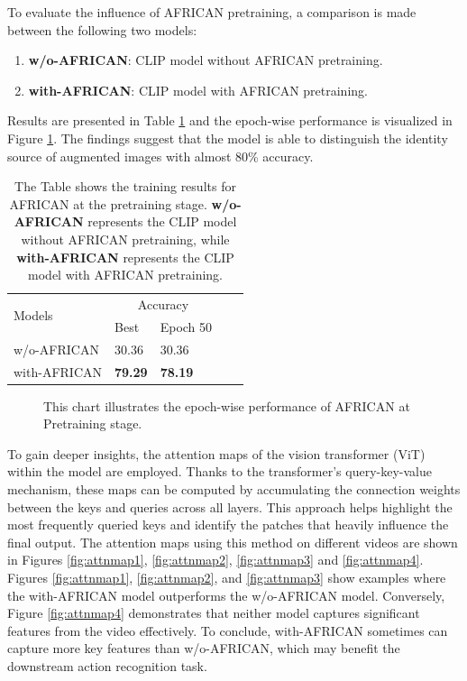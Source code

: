To evaluate the influence of AFRICAN pretraining, a comparison is made between the following two models: 

\begin{enumerate}
    \item \textbf{w/o-AFRICAN}: CLIP model without AFRICAN pretraining.
    \item \textbf{with-AFRICAN}: CLIP model with AFRICAN pretraining.
\end{enumerate}

Results are presented in Table \ref{tab:africanpretrainingresults} and the epoch-wise performance is visualized in Figure \ref{fig:tp_africanpretraining}. The findings suggest that the model is able to distinguish the identity source of augmented images with almost 80\% accuracy. 

\begin{table}[ht]
    \centering
    \caption[Training Results for AFRICAN at Pretraining stage]{The Table shows the training results for AFRICAN at the pretraining stage. \textbf{w/o-AFRICAN} represents the CLIP model without AFRICAN pretraining, while \textbf{with-AFRICAN} represents the CLIP model with AFRICAN pretraining.
}
    \label{tab:africanpretrainingresults}
    \begin{tabular}{lllll}
        \toprule
        \multirow{2}{*}{Models} & \multicolumn{2}{c}{Accuracy} \\
        \cmidrule{2-3} 
        {} &  Best & Epoch 50\\
        \midrule
        w/o-AFRICAN   & 30.36 & 30.36 \\
        with-AFRICAN  & \textbf{79.29} & \textbf{78.19} \\
        \bottomrule
    \end{tabular}
\end{table}

\begin{figure}[ht]
    \centering
    \resizebox{0.8\textwidth}{!}{}
    \caption[Accuracy of AFRICAN on each Epoch at Pretraining stage]{This chart illustrates the epoch-wise performance of AFRICAN at Pretraining stage.}
    \label{fig:tp_africanpretraining}
\end{figure}

To gain deeper insights, the attention maps of the vision transformer (ViT) within the model are employed. Thanks to the transformer's query-key-value mechanism, these maps can be computed by accumulating the connection weights between the keys and queries across all layers. This approach helps highlight the most frequently queried keys and identify the patches that heavily influence the final output. The attention maps using this method on different videos are shown in Figures \ref{fig:attnmap1}, \ref{fig:attnmap2}, \ref{fig:attnmap3} and \ref{fig:attnmap4}. Figures \ref{fig:attnmap1}, \ref{fig:attnmap2}, and \ref{fig:attnmap3} show examples where the with-AFRICAN model outperforms the w/o-AFRICAN model. Conversely, Figure \ref{fig:attnmap4} demonstrates that neither model captures significant features from the video effectively. To conclude,  with-AFRICAN sometimes can capture more key features than w/o-AFRICAN, which may benefit the downstream action recognition task.


